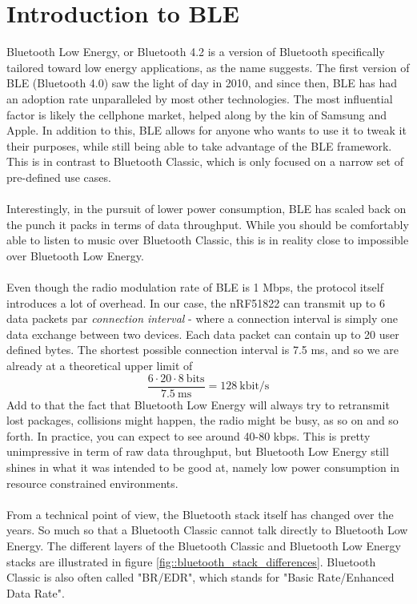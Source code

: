 \documentclass[11pt,a4paper]{article}
\begin{document}
\section{Introduction to BLE}
\label{app::intro_ble}
Bluetooth Low Energy, or Bluetooth 4.2 is a version of Bluetooth specifically tailored toward low energy applications, as the name suggests. The first version of BLE (Bluetooth 4.0) saw the light of day in 2010, and since then, BLE has had an adoption rate unparalleled by most other technologies. The most influential factor is likely the cellphone market, helped along by the kin of Samsung and Apple. In addition to this, BLE allows for anyone who wants to use it to tweak it their purposes, while still being able to take advantage of the BLE framework. This is in contrast to Bluetooth Classic, which is only focused on a narrow set of pre-defined use cases.\\
\\
Interestingly, in the pursuit of lower power consumption, BLE has scaled back on the punch it packs in terms of data throughput. While you should be comfortably able to listen to music over Bluetooth Classic, this is in reality close to impossible over Bluetooth Low Energy.\\
\\
Even though the radio modulation rate of BLE is 1 Mbps, the protocol itself introduces a lot of overhead. In our case, the nRF51822 can transmit up to 6 data packets par \textit{connection interval} - where a connection interval is simply one data exchange between two devices. Each data packet can contain up to 20 user defined bytes. The shortest possible connection interval is 7.5 ms, and so we are already at a theoretical upper limit of
$$\frac{6 \cdot 20 \cdot 8\ \mathrm{bits}}{7.5\ \mathrm{ms}} = 128\ \mathrm{kbit}/\mathrm{s}$$
Add to that the fact that Bluetooth Low Energy will always try to retransmit lost packages, collisions might happen, the radio might be busy, as so on and so forth. In practice, you can expect to see around 40-80 kbps. This is pretty unimpressive in term of raw data throughput, but Bluetooth Low Energy still shines in what it was intended to be good at, namely low power consumption in resource constrained environments.\\
\\
From a technical point of view, the Bluetooth stack itself has changed over the years. So much so that a Bluetooth Classic cannot talk directly to Bluetooth Low Energy. The different layers of the Bluetooth Classic and Bluetooth Low Energy stacks are illustrated in figure \ref{fig::bluetooth_stack_differences}. Bluetooth Classic is also often called "BR/EDR", which stands for "Basic Rate/Enhanced Data Rate".\\
\end{document}
